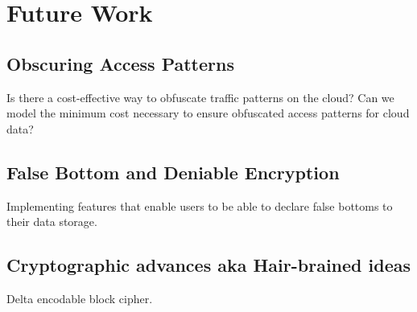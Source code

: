 \section{Future Work}

\subsection{Obscuring Access Patterns}

Is there a cost-effective way to obfuscate traffic patterns on the
cloud? Can we model the minimum cost necessary to ensure obfuscated
access patterns for cloud data?

\subsection{False Bottom and Deniable Encryption}
Implementing features that enable users to be able to declare false
bottoms to their data storage.

\subsection{Cryptographic advances aka Hair-brained ideas}

Delta encodable block cipher.
